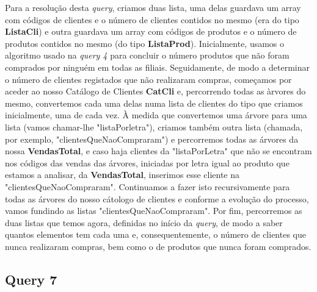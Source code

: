 \documentclass{article}
\begin{document}
\par\noindent\hspace{0.52cm} Para a resolução desta \textit{query}, criamos duas lista, uma delas guardava um array com códigos de clientes e o número de clientes contidos no mesmo (era do tipo \textbf{ListaCli}) e outra guardava um array com códigos de produtos e o número de produtos contidos no mesmo (do tipo \textbf{ListaProd}). Inicialmente, usamos o algoritmo usado na \textit{query 4} para concluir o número produtos que não foram comprados por ninguém em todas as filiais. Seguidamente, de modo a determinar o número de clientes registados que não realizaram compras, começamos por aceder  ao nosso Catálogo de Clientes \textbf{CatCli} e, percorrendo todas as àrvores do mesmo, convertemos cada uma delas numa lista de clientes do tipo que criamos inicialmente, uma de cada vez. À medida que convertemos uma árvore para uma lista (vamos chamar-lhe "listaPorletra"), criamos também outra lista (chamada, por exemplo, "clientesQueNaoCompraram") e percorremos  todas as árvores da nossa \textbf{VendasTotal}, e caso haja clientes da "listaPorLetra" que não se encontram nos códigos das vendas das árvores, iniciadas por letra igual ao produto que estamos a analisar, da \textbf{VendasTotal}, inserimos esse cliente na "clientesQueNaoCompraram". Continuamos a fazer isto recursivamente para todas as árvores do nosso cátologo de clientes e conforme a evolução do processo, vamos fundindo as listas "clientesQueNaoCompraram". Por fim, percorremos as duas listas que temos agora, definidas no início da \textit{query}, de modo a saber quantos elementos tem cada uma e, consequentemente, o número de clientes que nunca realizaram compras, bem como o de produtos que nunca foram comprados.

\subsection{Query 7}


\vspace{1 cm}
\end{document}
